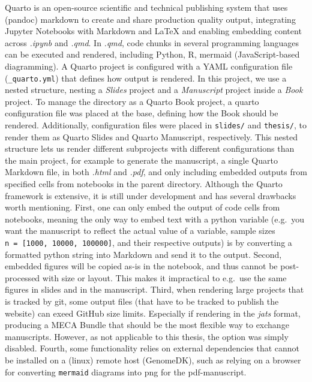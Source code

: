 \documentclass[
  11pt,
  a4paper,
]{scrbook}
\begin{document}
Quarto is an open-source scientific and technical publishing system that
uses (pandoc) markdown to create and share production quality output,
integrating Jupyter Notebooks with Markdown and LaTeX and enabling
embedding content across \emph{.ipynb} and \emph{.qmd}. In \emph{.qmd},
code chunks in several programming languages can be executed and
rendered, including Python, R, mermaid (JavaScript-based diagramming). A
Quarto project is configured with a YAML configuration file
(\texttt{\_quarto.yml}) that defines how output is rendered. In this
project, we use a nested structure, nesting a \emph{Slides} project and
a \emph{Manuscript} project inside a \emph{Book} project. To manage the
directory as a Quarto Book project, a quarto configuration file was
placed at the base, defining how the Book should be rendered.
Additionally, configuration files were placed in \texttt{slides/} and
\texttt{thesis/}, to render them as Quarto Slides and Quarto Manuscript,
respectively. This nested structure lets us render different subprojects
with different configurations than the main project, for example to
generate the manuscript, a single Quarto Markdown file, in both
\emph{.html} and \emph{.pdf}, and only including embedded outputs from
specified cells from notebooks in the parent directory. Although the
Quarto framework is extensive, it is still under development and has
several drawbacks worth mentioning. First, one can only embed the output
of code cells from notebooks, meaning the only way to embed text with a
python variable (e.g.~you want the manuscript to reflect the actual
value of a variable, sample sizes
\texttt{n\ =\ {[}1000,\ 10000,\ 100000{]}}, and their respective
outputs) is by converting a formatted python string into Markdown and
send it to the output. Second, embedded figures will be copied as-is in
the notebook, and thus cannot be post-processed with size or layout.
This makes it impractical to e.g.~use the same figures in slides and in
the manuscript. Third, when rendering large projects that is tracked by
git, some output files (that have to be tracked to publish the website)
can exeed GitHub size limits. Especially if rendering in the \emph{jats}
format, producing a MECA Bundle that should be the most flexible way to
exchange manuscripts. However, as not applicable to this thesis, the
option was simply disabled. Fourth, some functionality relies on
external dependencies that cannot be installed on a (linux) remote host
(GenomeDK), such as relying on a browser for converting \texttt{mermaid}
diagrams into png for the pdf-manuscript.
\end{document}
